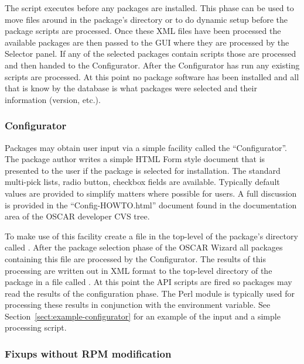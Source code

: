 The  script executes before any packages are installed.  This
phase can be used to move files around in the package's directory or to do
dynamic setup before the package  scripts are processed.
Once these XML files have been processed the available packages are then
passed to the GUI where they are processed by the Selector panel.  If any
of the selected packages contain  scripts those are
processed and then handed to the Configurator.  After the Configurator has
run any existing  scripts are processed.  At this
point no package software has been installed and all that is know by the
database is what packages were selected and their 
information (version, etc.).

\subsubsection{Configurator}
\label{sect:pkg-configurator}

Packages may obtain user input via a simple facility called the
``Configurator''.  The package author writes a simple HTML Form style
document that is presented to the user if the package is selected for
installation.  The standard multi-pick lists, radio button, checkbox fields
are available.  Typically default values are provided to simplify matters
where possible for users.  A full discussion is provided in the
``Config-HOWTO.html'' document found in the documentation area of the OSCAR
developer CVS tree.

To make use of this facility create a file in the top-level of the
package's directory called .  After the package
selection phase of the OSCAR Wizard all packages containing this file are
processed by the Configurator.  The results of this processing are written
out in XML format to the top-level directory of the package in a file
called .  At this point the
 API scripts are fired so packages may read the
results of the configuration phase.    The Perl  module
is typically used for processing these results in conjunction with the
 environment variable.  See
Section~\ref{sect:example-configurator} for an example of the input and
a simple processing script.


\subsubsection{Fixups without RPM modification}

